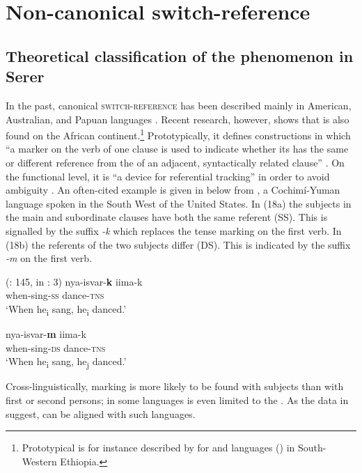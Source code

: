 \documentclass[output=paper
,newtxmath
,modfonts
,nonflat]{langsci/langscibook}
\begin{document}
\section{Non-canonical switch-reference}\label{sec:apel:3}

\subsection{Theoretical classification of the phenomenon in Serer}\label{sec:apel:3.1}

In the past, canonical \textsc{switch-reference} has been described mainly in American, Australian, and Papuan languages \citep{HaimanMunro83}. Recent research, however, shows that  is also found on the African continent.\footnote{Prototypical  is for instance described by \citet{Treis2012} for  and  languages () in South-Western Ethiopia.}  Prototypically, it defines constructions in which “a marker on the verb of one clause is used to indicate whether its  has the same or different reference from the  of an adjacent, syntactically related clause” \citep[1]{Stirling1993}. On the functional level, it is “a device for referential tracking” in order to avoid ambiguity \citep[xi]{HaimanMunro83}. An often-cited example is given in  below from , a Cochimí-Yuman language spoken in the South West of the United States. In (18a) the subjects in the main and subordinate clauses have both the same referent (SS). This is signalled by the suffix \textit{-k} which replaces the tense marking on the first verb. In (18b) the referents of the two subjects differ (DS). This is indicated by the suffix \textit{-m} on the first verb.

\ea\label{ex:apel:18}
{ (\citealt{Munro1980}: 145, in \citealt{Stirling1993}: 3)}
\ea
\gll   nya-isvar-\textbf{k} iima-k\\
     when\textsc{-}sing\textsc{-ss} dance\textsc{-tns} \\
\glt ‘When he\textsubscript{i} sang, he\textsubscript{i} danced.’

\ex
\gll nya-isvar-\textbf{m} iima-k\\
     when\textsc{-}sing\textsc{-ds} dance\textsc{-tns} \\
\glt ‘When he\textsubscript{i} sang, he\textsubscript{j} danced.’
\z
\z

Cross-linguistically,  marking is more likely to be found with  subjects than with first or second persons; in some languages  is even limited to the  \citep[xi]{HaimanMunro83}. As the data in  suggest,  can be aligned with such languages.
\end{document}
